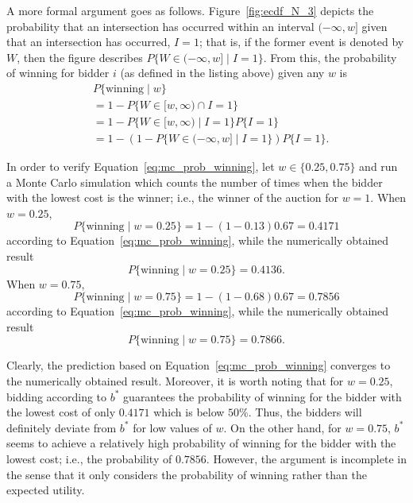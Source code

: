 A more formal argument goes as follows. Figure~\ref{fig:ecdf_N_3} depicts the probability that an intersection has occurred within an interval $(-\infty,w]$ given that an intersection has occurred, $I=1$; that is, if the former event is denoted by $W$, then the figure describes $P\{W\in(-\infty, w] \mid I=1\}$. From this, the probability of winning for bidder $i$ (as defined in the listing above) given any $w$ is
\begin{align}
	&P\{\text{winning} \mid w\} \nonumber\\
	&= 1 - P\{W\in[w,\infty) \cap I=1\} \nonumber\\
	&= 1 - P\{W\in[w,\infty)\mid I=1\}P\{I=1\} \nonumber\\
	&= 1 - \left( 1 - P\{W\in(-\infty, w]\mid I=1\} \right)P\{I=1\}.
	\label{eq:mc_prob_winning}
\end{align}

In order to verify Equation~\eqref{eq:mc_prob_winning}, let $w\in\{0.25,0.75\}$ and run a Monte Carlo simulation which counts the number of times when the bidder with the lowest cost is the winner; i.e., the winner of the auction for $w=1$. When $w=0.25$, 
\begin{equation*}
	P\{\text{winning}\mid w=0.25\} = 1 - (1-0.13)0.67 = 0.4171
\end{equation*}
according to Equation~\eqref{eq:mc_prob_winning}, while the numerically obtained result 
\begin{equation*}
	P\{\text{winning}\mid w=0.25\} = 0.4136.
\end{equation*}
When $w=0.75$,
\begin{equation*}
	P\{\text{winning}\mid w=0.75\} = 1 -(1-0.68)0.67 = 0.7856
\end{equation*}
according to Equation~\eqref{eq:mc_prob_winning}, while the numerically obtained result
\begin{equation*}
	P\{\text{winning}\mid w=0.75\} = 0.7866.
\end{equation*}

Clearly, the prediction based on Equation~\eqref{eq:mc_prob_winning} converges to the numerically obtained result. Moreover, it is worth noting that for $w=0.25$, bidding according to $b^*$ guarantees the probability of winning for the bidder with the lowest cost of only $0.4171$ which is below $50\%$. Thus, the bidders will definitely deviate from $b^*$ for low values of $w$. On the other hand, for $w=0.75$, $b^*$ seems to achieve a relatively high probability of winning for the bidder with the lowest cost; i.e., the probability of $0.7856$. However, the argument is incomplete in the sense that it only considers the probability of winning rather than the expected utility.


